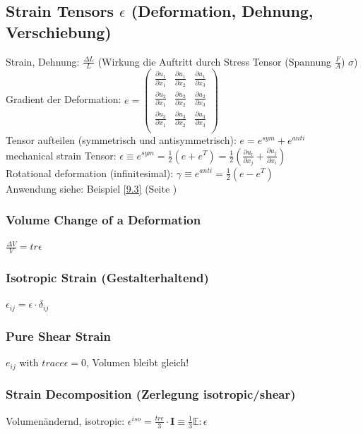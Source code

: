 \documentclass[a4paper, 10pt]{scrartcl}
\begin{document}
\subsection{Strain Tensors $\epsilon$ (Deformation, Dehnung, Verschiebung)}
Strain, Dehnung: $\frac{\Delta L}{L}$ (Wirkung die Auftritt durch Stress
Tensor (Spannung $\frac{F}{A}$) $\sigma$)\\
Gradient der Deformation: $e = \begin{pmatrix}
\frac{\partial u_1}{\partial x_1} & \frac{\partial u_1}{\partial x_2} &
\frac{\partial u_1}{\partial x_3}\\
\frac{\partial u_2}{\partial x_1} & \frac{\partial u_2}{\partial x_2} &
\frac{\partial u_2}{\partial x_3}\\
\frac{\partial u_3}{\partial x_1} & \frac{\partial u_3}{\partial x_2} &
\frac{\partial u_3}{\partial x_3}\\
\end{pmatrix}$\\
Tensor aufteilen (symmetrisch und antisymmetrisch): $e = e^{sym} + e^{anti}$\\
mechanical strain Tensor: $\epsilon \equiv e^{sym} = \frac{1}{2} (e + e^T) =
\frac{1}{2} (\frac{\partial u_i}{\partial x_j} + \frac{\partial
	u_j}{\partial x_i})$\\
Rotational deformation (infinitesimal): $\gamma \equiv e^{anti} = \frac{1}{2} (e
- e^T)$\\
Anwendung siehe: Beispiel \ref{9.3} (Seite \pageref{9.3})

\subsubsection{Volume Change of a Deformation}
$\frac{\Delta V}{V} = tr \epsilon $

\subsubsection{Isotropic Strain (Gestalterhaltend)}
$\epsilon_{ij} = \epsilon \cdot \delta_{ij} $

\subsubsection{Pure Shear Strain}
$e_{ij}$ with $trace \epsilon = 0$, Volumen bleibt gleich!

\subsubsection{Strain Decomposition (Zerlegung isotropic/shear)}
\label{straindecomposition}
Volumenändernd, isotropic: $\epsilon^{iso} = \frac{tr \epsilon}{3} \cdot \mathbf{I}
\equiv \frac{1}{3} \mathbb{E} : \epsilon$\\
\end{document}
